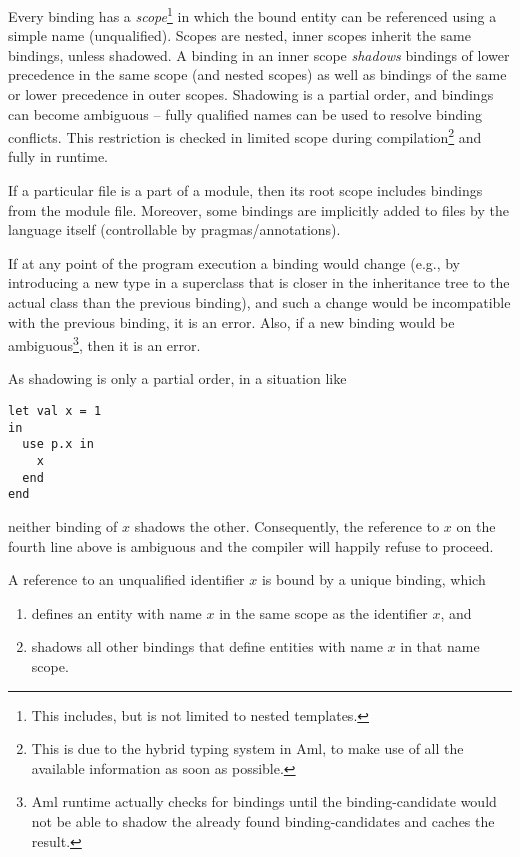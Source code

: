 Every binding has a \emph{scope}\footnote{This includes, but is not limited to nested templates.} in which the bound entity can be referenced using a simple name (unqualified). Scopes are nested, inner scopes inherit the same bindings, unless shadowed. A binding in an inner scope \emph{shadows} bindings of lower precedence in the same scope (and nested scopes) as well as bindings of the same or lower precedence in outer scopes. Shadowing is a partial order, and bindings can become ambiguous -- fully qualified names can be used to resolve binding conflicts. This restriction is checked in limited scope during compilation\footnote{This is due to the hybrid typing system in Aml, to make use of all the available information as soon as possible.} and fully in runtime. 

If a particular file is a part of a module, then its root scope includes bindings from the module file. Moreover, some bindings are implicitly added to files by the language itself (controllable by pragmas/annotations). 

If at any point of the program execution a binding would change (e.g., by introducing a new type in a superclass that is closer in the inheritance tree to the actual class than the previous binding), and such a change would be incompatible with the previous binding, it is an error. Also, if a new binding would be ambiguous\footnote{Aml runtime actually checks for bindings until the binding-candidate would not be able to shadow the already found binding-candidates and caches the result.}, then it is an error. 

As shadowing is only a partial order, in a situation like

\begin{lstlisting}
let val x = 1 
in
  use p.x in
    x
  end
end
\end{lstlisting}

neither binding of $x$ shadows the other. Consequently, the reference to $x$ on the fourth line above is ambiguous and the compiler will happily refuse to proceed. 

A reference to an unqualified identifier $x$ is bound by a unique binding, which

\begin{enumerate}
\item defines an entity with name $x$ in the same scope as the identifier $x$, and
\item shadows all other bindings that define entities with name $x$ in that name scope.
\end{enumerate}

